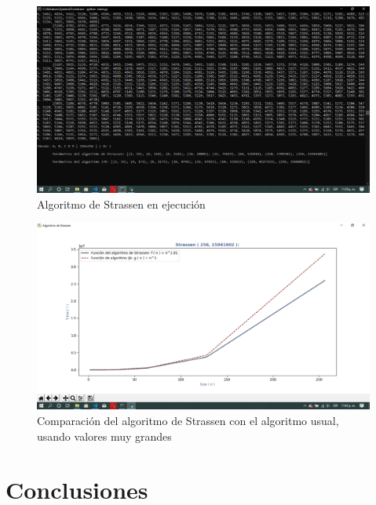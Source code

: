 \documentclass[12pt,twoside]{article}
\begin{document}
\begin{figure}[H]
    \centering
    \includegraphics[scale=0.35]{vs3.png}
    \caption{Algoritmo de Strassen en ejecuci\'on}
    \label{fig:strassen_exec}
\end{figure}
\begin{figure}[H]
    \centering
    \includegraphics[scale=0.35]{vs4.png}
    \caption{Comparaci\'on del algoritmo de Strassen con el algoritmo usual, usando valores muy grandes}
    \label{fig:strassen_vs}
\end{figure}


\section{Conclusiones}
\end{document}
